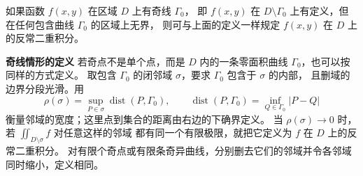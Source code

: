 如果函数 $f(x,y)$ 在区域 $D$ 上有奇线 $\Gamma_0$，
即 $f(x,y)$ 在 $D\setminus\Gamma_0$ 上有定义，但在任何包含曲线 $\Gamma_0$ 的区域上无界，
则可与上面的定义一样规定 $f(x,y)$ 在 $D$ 上的反常二重积分。

\textbf{奇线情形的定义}
若奇点不是单个点，而是 $D$ 内的一条零面积曲线 $\Gamma_0$，也可以按同样的方式定义。
取包含 $\Gamma_0$ 的闭邻域 $\sigma$，要求 $\Gamma_0$ 包含于 $\sigma$ 的内部，
且删域的边界分段光滑。用
\[
\rho(\sigma)=\sup_{P\in\sigma}\operatorname{dist}(P,\Gamma_0),\qquad
\operatorname{dist}(P,\Gamma_0)=\inf_{Q\in\Gamma_0}|P-Q|
\]
衡量邻域的宽度；这里点到集合的距离由右边的下确界定义。
当 $\rho(\sigma)\to0$ 时，若 $\displaystyle\iint_{D\setminus\sigma}f$ 对任意这样的邻域
都有同一个有限极限，就把它定义为 $f$ 在 $D$ 上的反常二重积分。
对有限个奇点或有限条奇异曲线，分别删去它们的邻域并令各邻域同时缩小，定义相同。



